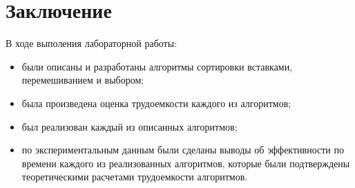 \chapter*{Заключение}

В ходе выполения лабораторной работы:

\begin{itemize}[left=\parindent]
    \item были описаны и разработаны алгоритмы сортировки вставками,
        перемешиванием и выбором;
    \item была произведена оценка трудоемкости каждого из алгоритмов;
    \item был реализован каждый из описанных алгоритмов;
    \item по экспериментальным данным были сделаны выводы об эффективности по
        времени каждого из реализованных алгоритмов, которые были подтверждены
        теоретическими расчетами трудоемкости алгоритмов.
\end{itemize}
